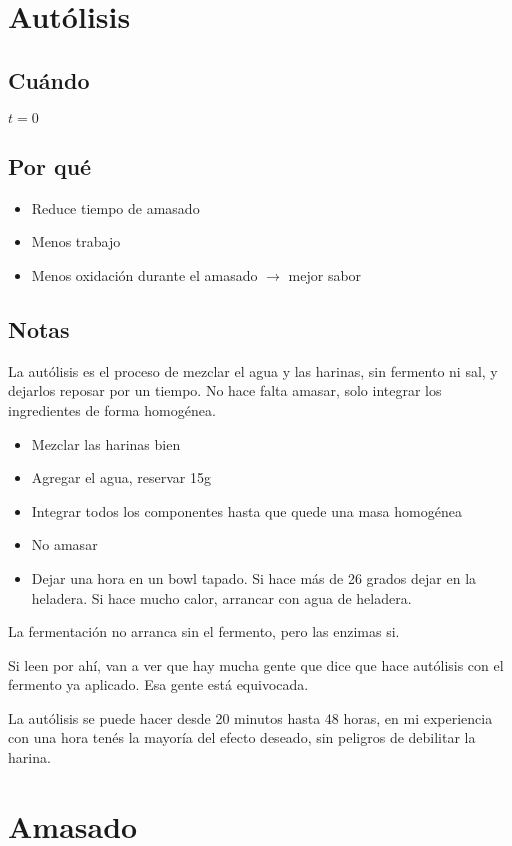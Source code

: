 \documentclass[10pt,a4paper]{article}
\begin{document}
\section{Autólisis}
\subsection*{Cuándo}
$t=0$
\subsection*{Por qué}
\begin{itemize}
\item Reduce tiempo de amasado
\item Menos trabajo
\item Menos oxidación durante el amasado $\rightarrow$ mejor sabor
\end{itemize}

\subsection*{Notas}
La autólisis es el proceso de mezclar el agua y las harinas, sin fermento ni
sal, y dejarlos reposar por un tiempo. No hace falta amasar, solo integrar los
ingredientes de forma homogénea.

\begin{itemize}
\item Mezclar las harinas bien
\item Agregar el agua, reservar 15g
\item Integrar todos los componentes hasta que quede una masa homogénea
\item No amasar
\item Dejar una hora en un bowl tapado. Si hace más de 26 grados dejar en la
  heladera. Si hace mucho calor, arrancar con agua de heladera.
\end{itemize}

La fermentación no arranca sin el fermento, pero las enzimas si.

Si leen por ahí, van a ver que hay mucha gente que dice que hace autólisis con
el fermento ya aplicado. Esa gente está equivocada.

La autólisis se puede hacer desde 20 minutos hasta 48 horas, en mi
experiencia con una hora tenés la mayoría del efecto deseado, sin
peligros de debilitar la harina.

\section{Amasado}
\end{document}
